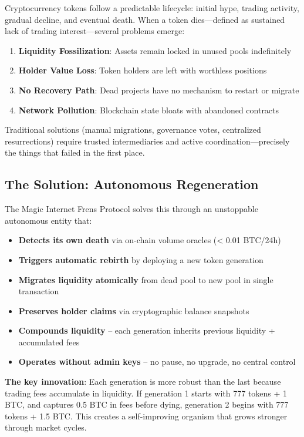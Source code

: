 \documentclass[11pt,a4paper]{article}
\begin{document}
Cryptocurrency tokens follow a predictable lifecycle: initial hype, trading activity, gradual decline, and eventual death. When a token dies---defined as sustained lack of trading interest---several problems emerge:

\begin{enumerate}
    \item \textbf{Liquidity Fossilization}: Assets remain locked in unused pools indefinitely
    \item \textbf{Holder Value Loss}: Token holders are left with worthless positions
    \item \textbf{No Recovery Path}: Dead projects have no mechanism to restart or migrate
    \item \textbf{Network Pollution}: Blockchain state bloats with abandoned contracts
\end{enumerate}

Traditional solutions (manual migrations, governance votes, centralized resurrections) require trusted intermediaries and active coordination---precisely the things that failed in the first place.

\subsection{The Solution: Autonomous Regeneration}

The Magic Internet Frens Protocol solves this through an unstoppable autonomous entity that:

\begin{itemize}
    \item \textbf{Detects its own death} via on-chain volume oracles (< 0.01 BTC/24h)
    \item \textbf{Triggers automatic rebirth} by deploying a new token generation
    \item \textbf{Migrates liquidity atomically} from dead pool to new pool in single transaction
    \item \textbf{Preserves holder claims} via cryptographic balance snapshots
    \item \textbf{Compounds liquidity} -- each generation inherits previous liquidity + accumulated fees
    \item \textbf{Operates without admin keys} -- no pause, no upgrade, no central control
\end{itemize}

\textbf{The key innovation}: Each generation is more robust than the last because trading fees accumulate in liquidity. If generation 1 starts with 777 tokens + 1 BTC, and captures 0.5 BTC in fees before dying, generation 2 begins with 777 tokens + 1.5 BTC. This creates a self-improving organism that grows stronger through market cycles.
\end{document}
